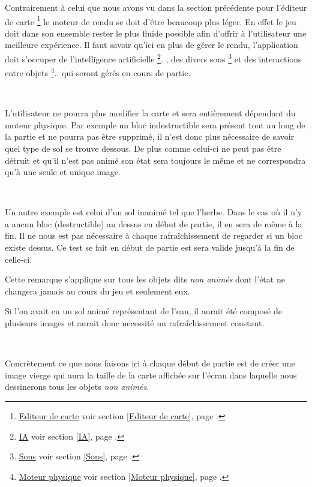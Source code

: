 			Contrairement à celui que nous avons vu dans la section précédente pour
			l'éditeur de carte
			\footnote{
				\hyperlink{Editeur de carte}{Editeur de carte}
				\og voir section \ref{Editeur de carte}, page \pageref{Editeur de carte}.\fg
			}
			le moteur de rendu se doit d'être beaucoup plus léger. En effet le jeu doit
			dans son ensemble rester le plus fluide possible afin d'offrir à l'utilisateur une meilleure
			expérience. Il faut savoir qu'ici en plus de gérer le rendu, l'application
			doit s'occuper de l'intelligence artificielle
			\footnote{
				\hyperlink{IA}{IA}
				\og voir section \ref{IA}, page \pageref{IA}.\fg
			}.
			, des divers sons
			\footnote{
				\hyperlink{Sons}{Sons}
				\og voir section \ref{Sons}, page \pageref{Sons}.\fg
			} et des interactions entre objets
			 \footnote{
				\hyperlink{Moteur physique}{Moteur physique}
				\og voir section \ref{Moteur physique}, page \pageref{Moteur physique}.\fg
			}..
			qui seront gérés en cours de partie.		
			
			$\,$	
			
			L'utilisateur ne pourra plus modifier la carte et sera
			entièrement dépendant du moteur physique\footnotemark[3]. Par
			exemple un bloc indestructible sera présent tout au long de la
			partie et ne pourra pas être supprimé, il n'est donc plus nécessaire de
			savoir quel type de sol se trouve dessous. De plus comme celui-ci ne peut pas
			être détruit et qu'il n'est pas animé son état sera toujours le même et ne
			correspondra qu'à une seule et unique image.
			
			$\,$			
			
			Un autre exemple est celui d'un sol inanimé tel que l'herbe. Dans le cas où
			il n'y a aucun bloc (destructible) au dessus en début de partie, il en sera
			de même à la fin. Il ne nous est pas nécessaire à chaque
			rafraîchissement de regarder si un bloc existe dessus. Ce test se fait en
			début de partie est sera valide jusqu'à la fin de celle-ci.
			
			
			Cette remarque s'applique sur tous les objets dits \emph{non animés} dont
			l'état ne changera jamais au cours du jeu et seulement eux.
			
			
			Si l'on avait eu un sol animé représentant de l'eau, il aurait été composé de
			plusieurs images et aurait donc necessité un rafraîchissement constant.

			$\,$
			
			Concrètement ce que nous faisons ici à chaque début de partie est de créer
			une image vierge qui aura la taille de la carte affichée sur l'écran dans
			laquelle nous dessinerons tous les objets \emph{non animés}.
			
